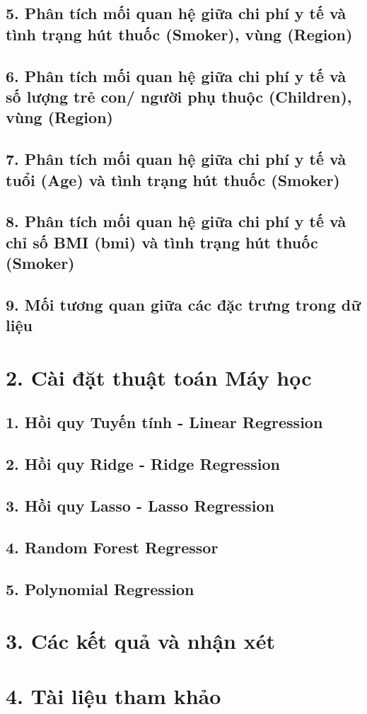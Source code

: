 \documentclass{article}
\begin{document}
	\subsection{5. Phân tích mối quan hệ giữa chi phí y tế và tình trạng hút thuốc (Smoker), vùng (Region)}
	
	\subsection{6. Phân tích mối quan hệ giữa chi phí y tế và  số lượng trẻ con/ người phụ thuộc (Children), vùng (Region)}
	
	\subsection{7. Phân tích mối quan hệ giữa chi phí y tế và tuổi (Age) và tình trạng hút thuốc (Smoker)}
	
	\subsection{8. Phân tích mối quan hệ giữa chi phí y tế và chỉ số BMI (bmi) và tình trạng hút thuốc (Smoker)}
	
	\subsection{9. Mối tương quan giữa các đặc trưng trong dữ liệu}
	
	\section{2. Cài đặt thuật toán Máy học}
	
	\subsection{1. Hồi quy Tuyến tính - Linear Regression}
	
	\subsection{2. Hồi quy Ridge - Ridge Regression}
	
	\subsection{3. Hồi quy Lasso - Lasso Regression}
	
	\subsection{4. Random Forest Regressor}
	
	\subsection{5. Polynomial Regression}
	
	\section{3. Các kết quả và nhận xét}
	
	\section{4. Tài liệu tham khảo}
	
\end{document}
